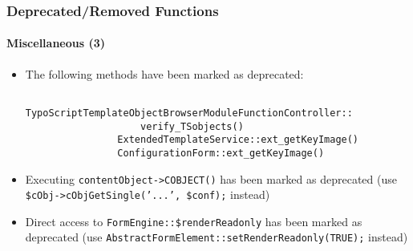 \begin{frame}[fragile]
	\frametitle{Deprecated/Removed Functions}
	\framesubtitle{Miscellaneous (3)}

	\begin{itemize}
		\item The following methods have been marked as deprecated:

			\begin{lstlisting}
				TypoScriptTemplateObjectBrowserModuleFunctionController::
				    verify_TSobjects()
				ExtendedTemplateService::ext_getKeyImage()
				ConfigurationForm::ext_getKeyImage()
			\end{lstlisting}

 		\item Executing \texttt{contentObject->COBJECT()} has been marked as deprecated\newline
 			\small(use \texttt{\$cObj->cObjGetSingle('...', \$conf);} instead)\normalsize
 
		\item Direct access to \texttt{FormEngine::\$renderReadonly} has been marked as deprecated\newline
			\small(use \texttt{AbstractFormElement::setRenderReadonly(TRUE);} instead)\normalsize
 
	\end{itemize}

\end{frame}


